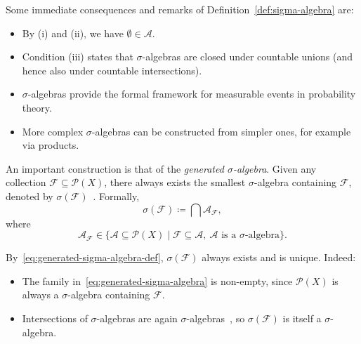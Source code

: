 \begin{notenl}
    Some immediate consequences and remarks of Definition~\ref{def:sigma-algebra} are:
    \begin{itemize}
        \item By (i) and (ii), we have $\emptyset \in \mathcal{A}$.
        \item Condition (iii) states that $\sigma$-algebras are closed under countable unions (and hence also under countable intersections).
        \item $\sigma$-algebras provide the formal framework for measurable events in probability theory.
        \item More complex $\sigma$-algebras can be constructed from simpler ones, for example via products.
    \end{itemize}
\end{notenl}

\medskip

An important construction is that of the \emph{generated $\sigma$-algebra}. Given any collection $\mathcal{F} \subseteq \mathcal{P}(X)$, there always exists the smallest $\sigma$-algebra containing $\mathcal{F}$, denoted by $\sigma(\mathcal{F})$~\cite[Cor.~1.1.3]{MeasureTheoryCohn}. Formally,
\begin{equation}
    \sigma(\mathcal{F}) \coloneq \bigcap \mathcal{A}_\mathcal{F},\label{eq:generated-sigma-algebra-def}
\end{equation}
where
\begin{equation}
    \mathcal{A}_{\mathcal{F}}
    \in \{\mathcal{A} \subseteq  \mathcal{P}(X) \mid \mathcal{F} \subseteq \mathcal{A}, \ \mathcal{A} \text{ is a } \sigma\text{-algebra} \}.\label{eq:generated-sigma-algebra}
\end{equation}

\begin{remarknl}
    By~\eqref{eq:generated-sigma-algebra-def}, $\sigma(\mathcal{F})$ always exists and is unique. Indeed:
    \begin{itemize}
        \item The family in~\eqref{eq:generated-sigma-algebra} is non-empty, since $\mathcal{P}(X)$ is always a $\sigma$-algebra containing $\mathcal{F}$.
        \item Intersections of $\sigma$-algebras are again $\sigma$-algebras~\cite[Prop.~1.1.2]{MeasureTheoryCohn}, so $\sigma(\mathcal{F})$ is itself a $\sigma$-algebra.
    \end{itemize}
\end{remarknl}

